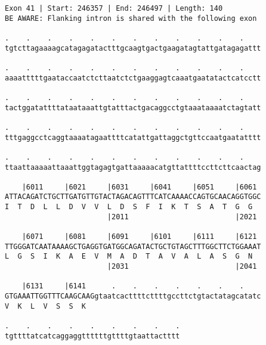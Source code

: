 \documentclass{article}
\begin{document}
\newpage
\begin{Verbatim}[fontfamily=courier]
Exon 41 | Start: 246357 | End: 246497 | Length: 140
BE AWARE: Flanking intron is shared with the following exon

.    .    .    .    .    .    .    .    .    .    .    .    
tgtcttagaaaagcatagagatactttgcaagtgactgaagatagtattgatagagattt

.    .    .    .    .    .    .    .    .    .    .    .    
aaaatttttgaataccaatctcttaatctctgaaggagtcaaatgaatatactcatcctt

.    .    .    .    .    .    .    .    .    .    .    .    
tactggatattttataataaattgtatttactgacaggcctgtaaataaaatctagtatt

.    .    .    .    .    .    .    .    .    .    .    .    
tttgaggcctcaggtaaaatagaattttcatattgattaggctgttccaatgaatatttt

.    .    .    .    .    .    .    .    .    .    .    .    
ttaattaaaaattaaattggtagagtgattaaaaacatgttattttccttcttcaactag

    |6011     |6021     |6031     |6041     |6051     |6061 
ATTACAGATCTGCTTGATGTTGTACTAGACAGTTTCATCAAAACCAGTGCAACAGGTGGC
I  T  D  L  L  D  V  V  L  D  S  F  I  K  T  S  A  T  G  G  
                        |2011                         |2021 

    |6071     |6081     |6091     |6101     |6111     |6121 
TTGGGATCAATAAAAGCTGAGGTGATGGCAGATACTGCTGTAGCTTTGGCTTCTGGAAAT
L  G  S  I  K  A  E  V  M  A  D  T  A  V  A  L  A  S  G  N  
                        |2031                         |2041 

    |6131     |6141      .    .    .    .    .    .    .    
GTGAAATTGGTTTCAAGCAAGgtaatcacttttcttttgccttctgtactatagcatatc
V  K  L  V  S  S  K                                         

.    .    .    .    .    .    .    .    .
tgttttatcatcaggaggttttttgttttgtaattactttt
\end{Verbatim}
\newpage
\end{document}
